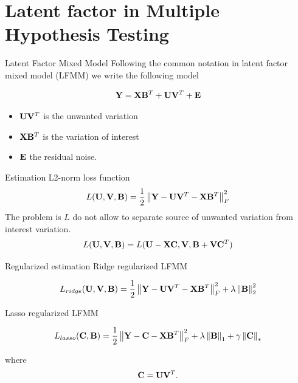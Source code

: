 \documentclass[presentation]{beamer}
\begin{document}
\section{Latent factor in Multiple Hypothesis Testing}
\label{sec:org2acb210}
\begin{frame}[label={sec:org93b6ce7}]{Latent Factor Mixed Model}
Following the common notation in \alert{latent factor mixed model} (LFMM) we write the following
model \cite{wang2015confounder,frichot13_testin_assoc_between_loci_envir}

\begin{equation}
\label{eq:model}
\mathbf{Y} = \mathbf{X} \mathbf{B}^T + \mathbf{U} \mathbf{V}^T + \mathbf{E} 
\end{equation}

\begin{itemize}
\item \(\mathbf{U} \mathbf{V}^{T}\) is the unwanted variation
\item \(\mathbf{X} \mathbf{B}^{T}\) is the variation of interest
\item \(\mathbf{E}\) the residual noise.
\end{itemize}
\end{frame}

\begin{frame}[label={sec:org65ba035}]{Estimation}
\alert{L2-norm loss function}
\begin{equation*}
\label{eq:optim_no_reg}
L(\mathbf{U}, \mathbf{V}, \mathbf{B}) = \frac{1}{2} \left\lVert\mathbf{Y} - \mathbf{U} \mathbf{V}^T - \mathbf{X} \mathbf{B}^T\right\rVert_{F}^2
\end{equation*}
\alert{The problem} is \(L\) do not allow to separate source of unwanted variation from
interest variation.
\begin{equation*}
L(\mathbf{U}, \mathbf{V}, \mathbf{B}) = L(\mathbf{U} - \mathbf{X} \mathbf{C}, \mathbf{V}, \mathbf{B} + \mathbf{V} \mathbf{C}^{T})
\end{equation*}
\end{frame}
\begin{frame}[label={sec:org096be5a}]{Regularized estimation}
\alert{Ridge} regularized LFMM

\begin{equation*}
L_{ridge}(\mathbf{U}, \mathbf{V}, \mathbf{B}) = \frac{1}{2} \left\lVert\mathbf{Y} - \mathbf{U} \mathbf{V}^T - \mathbf{X} \mathbf{B}^T\right\rVert_{F}^2 + \lambda \left\lVert\mathbf{B}\right\rVert^{2}_{2}
\end{equation*}

\alert{Lasso} regularized LFMM

\begin{equation*}
L_{lasso}(\mathbf{C}, \mathbf{B}) =  \frac{1}{2} \left\lVert\mathbf{Y} - \mathbf{C} - \mathbf{X} \mathbf{B}^T\right\rVert_{F}^2 + \lambda \left\lVert\mathbf{B}\right\rVert_{1} + \gamma \left\lVert\mathbf{C}\right\rVert_{*}
\end{equation*}

where $$\mathbf{C} = \mathbf{U} \mathbf{V}^{T}.$$
\end{frame}
\end{document}
